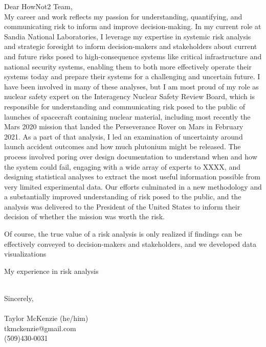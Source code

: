 \documentclass[10pt]{article}
\begin{document}
	

\noindent Dear HowNot2 Team,\\

My career and work reflects my passion for understanding, quantifying, and communicating risk to inform and improve decision-making. In my current role at Sandia National Laboratories, I leverage my expertise in systemic risk analysis and strategic foresight to inform decision-makers and stakeholders about current and future risks posed to high-consequence systems like critical infrastructure and national security systems, enabling them to both more effectively operate their systems today and prepare their systems for a challenging and uncertain future. I have been involved in many of these analyses, but I am most proud of my role as nuclear safety expert on the Interagency Nuclear Safety Review Board, which is responsible for understanding and communicating risk posed to the public of launches of spacecraft containing nuclear material, including most recently the Mars 2020 mission that landed the Perseverance Rover on Mars in February 2021. As a part of that analysis, I led an examination of uncertainty around launch accident outcomes and how much plutonium might be released. The process involved poring over design documentation to understand when and how the system could fail, engaging with a wide array of experts to XXXX, and designing statistical analyses to extract the most useful information possible from very limited experimental data. Our efforts culminated in a new methodology and a substantially improved understanding of risk posed to the public, and the analysis was delivered to the President of the United States to inform their decision of whether the mission was worth the risk.

Of course, the true value of a risk analysis is only realized if findings can be effectively conveyed to decision-makers and stakeholders, and we developed data visualizations 

My experience in risk analysis 

\noindent \\Sincerely,\\\\
Taylor McKenzie (he/him)\\
tkmckenzie@gmail.com\\
(509)430-0031
\end{document}
